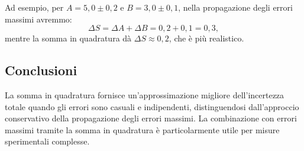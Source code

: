 Ad esempio, per $A = 5,0 \pm 0,2$ e $B = 3,0 \pm 0,1$, nella propagazione degli errori massimi avremmo:
\[
\Delta S = \Delta A + \Delta B = 0,2 + 0,1 = 0,3,
\]
mentre la somma in quadratura dà $\Delta S \approx 0,2$, che è più realistico.

\subsection{Conclusioni}
La somma in quadratura fornisce un'approssimazione migliore dell'incertezza totale quando gli errori sono casuali e indipendenti, distinguendosi dall'approccio conservativo della propagazione degli errori massimi. La combinazione con errori massimi tramite la somma in quadratura è particolarmente utile per misure sperimentali complesse.
